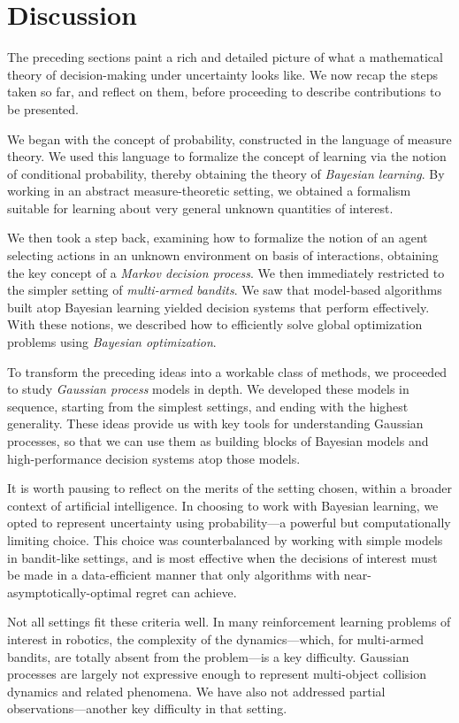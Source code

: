 \documentclass[11pt]{book}
\begin{document}
\section{Discussion}

The preceding sections paint a rich and detailed picture of what a mathematical theory of decision-making under uncertainty looks like.
We now recap the steps taken so far, and reflect on them, before proceeding to describe contributions to be presented.

We began with the concept of probability, constructed in the language of measure theory. 
We used this language to formalize the concept of learning via the notion of conditional probability, thereby obtaining the theory of \emph{Bayesian learning}.
By working in an abstract measure-theoretic setting, we obtained a formalism suitable for learning about very general unknown quantities of interest.

We then took a step back, examining how to formalize the notion of an agent selecting actions in an unknown environment on basis of interactions, obtaining the key concept of a \emph{Markov decision process}.
We then immediately restricted to the simpler setting of \emph{multi-armed bandits}.
We saw that model-based algorithms built atop Bayesian learning yielded decision systems that perform effectively.
With these notions, we described how to efficiently solve global optimization problems using \emph{Bayesian optimization}.

To transform the preceding ideas into a workable class of methods, we proceeded to study \emph{Gaussian process} models in depth.
We developed these models in sequence, starting from the simplest settings, and ending with the highest generality.
These ideas provide us with key tools for understanding Gaussian processes, so that we can use them as building blocks of Bayesian models and high-performance decision systems atop those models.

It is worth pausing to reflect on the merits of the setting chosen, within a broader context of artificial intelligence.
In choosing to work with Bayesian learning, we opted to represent uncertainty using probability---a powerful but computationally limiting choice.
This choice was counterbalanced by working with simple models in bandit-like settings, and is most effective when the decisions of interest must be made in a data-efficient manner that only algorithms with near-asymptotically-optimal regret can achieve.

Not all settings fit these criteria well.
In many reinforcement learning problems of interest in robotics, the complexity of the dynamics---which, for multi-armed bandits, are totally absent from the problem---is a key difficulty.
Gaussian processes are largely not expressive enough to represent multi-object collision dynamics and related phenomena.
We have also not addressed partial observations---another key difficulty in that setting.
\end{document}

